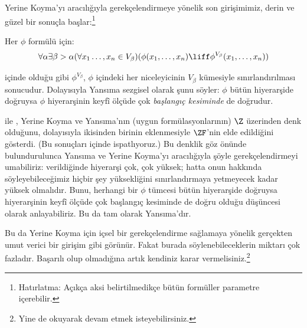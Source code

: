\documentclass[../../../include/open-logic-section]{subfiles}
\begin{document}

Yerine Koyma'yı \stagesinex{} aracılığıyla gerekçelendirmeye yönelik son
girişimimiz, derin ve güzel bir sonuçla başlar:\footnote{Hatırlatma: Açıkça
aksi belirtilmedikçe bütün formüller parametre içerebilir.}
\begin{thm}
Her $\phi$ formülü için:
\[
\forall \alpha \exists \beta > \alpha (\forall x_1 \ldots, x_n \in
V_\beta)(\phi(x_1, \ldots, x_n) \liff \phi^{V_\beta}(x_1, \ldots, x_n))
\]
\end{thm}
\noindent 
{} içinde olduğu gibi
$\phi^{V_\beta}$, $\phi$ içindeki her niceleyicinin $V_\beta$ kümesiyle
sınırlandırılması sonucudur. Dolayısıyla Yansıma sezgisel olarak şunu söyler:
$\phi$ bütün hiyerarşide doğruysa $\phi$ hiyerarşinin keyfî ölçüde çok
\emph{başlangıç kesiminde} de doğrudur.

\citet{Montague1961} ile \citet{Levy1960}, Yerine Koyma ve Yansıma'nın (uygun
formülasyonlarının) $\Z$ üzerinden denk olduğunu, dolayısıyla ikisinden
birinin eklenmesiyle $\ZF$'nin elde edildiğini gösterdi. (Bu sonuçları
 içinde ispatlıyoruz.) Bu denklik göz
önünde bulundurulunca Yansıma ve Yerine Koyma'yı \stagesinex{} aracılığıyla
şöyle gerekçelendirmeyi umabiliriz: \stagesinex{} verildiğinde hiyerarşi çok,
çok yüksek; hatta onun hakkında söyleyebileceğimiz hiçbir şey yüksekliğini
sınırlandırmaya yetmeyecek kadar yüksek olmalıdır. Bunu, herhangi bir
$\phi$ tümcesi bütün hiyerarşide doğruysa hiyerarşinin keyfî ölçüde çok
başlangıç kesiminde de doğru olduğu düşüncesi olarak anlayabiliriz. Bu da tam
olarak Yansıma'dır.

Bu da Yerine Koyma için içsel bir gerekçelendirme sağlamaya yönelik gerçekten
umut verici bir girişim gibi görünür. Fakat burada söylenebileceklerin miktarı
çok fazladır. Başarılı olup olmadığına artık kendiniz karar vermelisiniz.\footnote{Yine de
\citet[95--100]{Incurvati2020} okuyarak devam etmek isteyebilirsiniz.}
\end{document}
